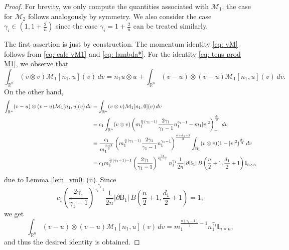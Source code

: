 \documentclass[10pt,reqno]{amsart}
\numberwithin{equation}{section}
\newcommand{\R}{\mathbb R}
\newcommand{\lt}{\left}
\newcommand{\rt}{\right}
\newcommand{\calM}{\mathcal M}
\begin{document}
\begin{proof} For brevity, we only compute the quantities associated with $\mathcal{M}_1$; the case for $\mathcal{M}_2$ follows analogously by symmetry. We also consider the case $\gamma_i \in (1, 1 + \frac2n)$ since the case $\gamma_i = 1 + \frac2n$ can be treated similarly.


    The first assertion is just by construction. The momentum identity \eqref{eq: vM} follows from  \eqref{eq: calc vM1} and \eqref{eq: lambda*}.  For the identity \eqref{eq: tens prod M1}, we observe that
    \[
    \int_{\R^n} (v\otimes v) \calM_1[n_1, u](v)\,dv = n_1 u \otimes u + \int_{\R^n} (v-u)\otimes (v-u) \calM_1[n_1, u](v)\,dv.
    \]
    On the other hand,
    \begin{align*}
    \int_{\R^n} (v-u)\otimes (v-u) \calM_1[n_1, u](v)\,dv &= \int_{\R^n} (v\otimes v) \calM_1[n_1, 0](v)\,dv\cr
    &= c_1 \int_{\mathbb{R}^n}  (v\otimes v) \left( m_1^{\frac{n}{2}(\gamma_1 - 1)} \frac{2\gamma_1}{\gamma_1 - 1} n_1^{\gamma_1 - 1} - m_1 |v|^2 \right)_+^{\frac{d_1}{2}}\, dv \\
&= \frac{c_1}{m_1^{\frac{n + 2}{2}}} \left( m_1^{\frac{n}{2}(\gamma_1 - 1)} \frac{2\gamma_1}{\gamma_1 - 1} n_1^{\gamma_1 - 1} \right)^{\frac{n + d_1 + 2}{2}} \int_{{\rm B}_1}(v\otimes v)  (1 - |v|^2)^{\frac{d_1}{2}}\, dv \\
&=c_1 m_1^{\frac{n}{2}(\gamma_1 - 1)-1} \lt(\frac{2\gamma_1}{\gamma_1 - 1}\rt)^{\frac{\gamma_1}{\gamma_1-1}} n_1^{\gamma_1} \frac{1}{2n} |\partial \mathrm{B}_1|\, B\left(\frac{n}{2}+1, \frac{d_1}2 + 1\right) \mathbb{I}_{n \times n}
    \end{align*}
    due to Lemma \ref{lem_vm0} (ii). Since 
    \[
   c_1  \lt(\frac{2\gamma_1}{\gamma_1 - 1}\rt)^{\frac{\gamma_1}{\gamma_1-1}}   \frac{1}{2n} |\partial \mathrm{B}_1|\, B\left(\frac{n}{2}+1, \frac{d_1}2 + 1\right) = 1,
    \]
    we get
    \[
     \int_{\R^n} (v-u)\otimes (v-u) \calM_1[n_1, u](v)\,dv = m_1^{\frac{n(\gamma_1-1)}{2}-1} n_1^{\gamma_1}\mathbb{I}_{n \times n},
    \]
    and thus the desired identity is obtained. 
 

\end{proof}
\end{document}

